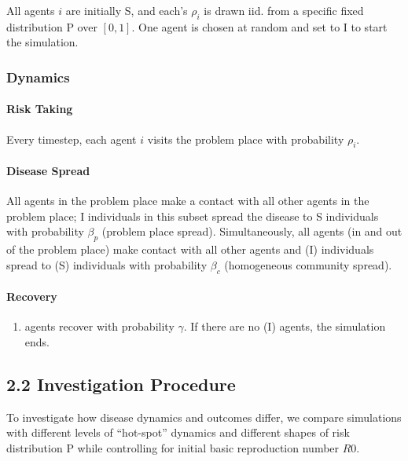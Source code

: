 All agents \(i\) are initially S, and each's \(\rho_i\) is drawn iid.
from a specific fixed distribution \(\mathrm{P}\) over \([0, 1]\). One
agent is chosen at random and set to I to start the simulation.

\subsubsection{Dynamics}\label{dynamics}

\paragraph{Risk Taking}\label{risk-taking}

Every timestep, each agent \(i\) visits the problem place with
probability \(\rho_i\).

\paragraph{Disease Spread}\label{disease-spread}

All agents in the problem place make a contact with all other agents in
the problem place; I individuals in this subset spread the disease to S
individuals with probability \(\beta_p\) (problem place spread).
Simultaneously, all agents (in and out of the problem place) make
contact with all other agents and (I) individuals spread to (S)
individuals with probability \(\beta_c\) (homogeneous community spread).

\paragraph{Recovery}\label{recovery}

\begin{enumerate}
\def\labelenumi{(\Roman{enumi})}
\tightlist
\item
  agents recover with probability \(\gamma\). If there are no (I)
  agents, the simulation ends.
\end{enumerate}

\subsection{2.2 Investigation Procedure}\label{investigation-procedure}

To investigate how disease dynamics and outcomes differ, we compare
simulations with different levels of ``hot-spot'' dynamics and different
shapes of risk distribution \(\mathrm{P}\) while controlling for initial
basic reproduction number \(R0\).

